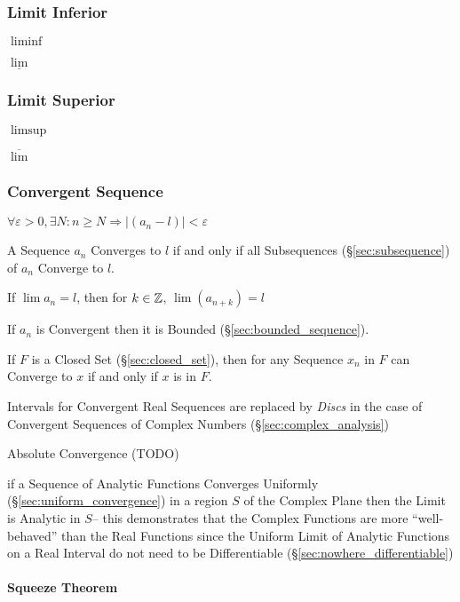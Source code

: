 \subsubsection{Limit Inferior}\label{sec:liminf}

$\liminf$

$\underline{\lim}$



\subsubsection{Limit Superior}\label{sec:limsup}

$\limsup$

$\overline{\lim}$



\subsubsection{Convergent Sequence}\label{sec:convergent_sequence}

$\forall \varepsilon > 0, \exists N : n \geq N \Rightarrow |(a_n - l)| <
\varepsilon$

A Sequence $a_n$ Converges to $l$ if and only if all Subsequences
(\S\ref{sec:subsequence}) of $a_n$ Converge to $l$.

If $\lim a_n = l$, then for $k \in \mathbb{Z}$, $\lim (a_{n+k}) = l$

If $a_n$ is Convergent then it is Bounded
(\S\ref{sec:bounded_sequence}).

If $F$ is a Closed Set (\S\ref{sec:closed_set}), then for any Sequence
$x_n$ in $F$ can Converge to $x$ if and only if $x$ is in $F$.

Intervals for Convergent Real Sequences are replaced by \emph{Discs} in the
case of Convergent Sequences of Complex Numbers (\S\ref{sec:complex_analysis})

Absolute Convergence (TODO)

if a Sequence of Analytic Functions Converges Uniformly
(\S\ref{sec:uniform_convergence}) in a region $S$ of the Complex Plane then the
Limit is Analytic in $S$-- this demonstrates that the Complex Functions are
more ``well-behaved'' than the Real Functions since the Uniform Limit of
Analytic Functions on a Real Interval do not need to be Differentiable
(\S\ref{sec:nowhere_differentiable})



\paragraph{Squeeze Theorem}\label{sec:squeeze_theorem}\hfill

